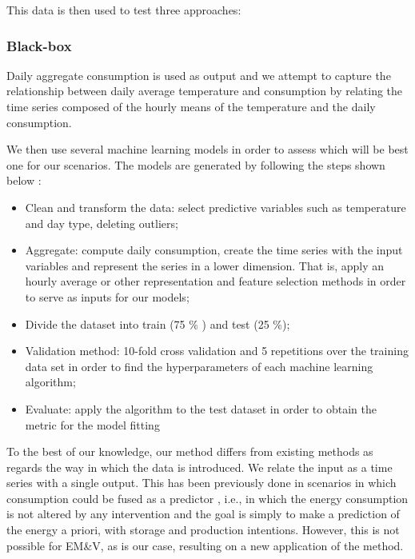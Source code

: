 \documentclass[10pt, conference, compsocconf]{IEEEtran}
\begin{document}
This data is then used to test three approaches:

\subsubsection{Black-box}

Daily aggregate consumption is used as output and we attempt to capture the relationship between daily average temperature and consumption by relating the time series composed of the hourly means of the temperature and the daily consumption.

We then use several machine learning models in order to assess which will be best one for our scenarios. The models are generated by following the steps shown below \cite{gonzalez2016towards}:

\begin{itemize}
\item Clean and transform the data: select predictive variables such as temperature and day type, deleting outliers; 
\item Aggregate: compute daily consumption, create the time series with the input variables and represent the series in a lower dimension. That is, apply an hourly average or other representation and feature selection methods in order to serve as inputs for our models;
\item Divide the dataset into train (75 \% ) and test (25 \%);
\item Validation method: 10-fold cross validation and 5 repetitions over the training data set in order to find the hyperparameters of each machine learning algorithm;
\item Evaluate: apply the algorithm to the test dataset in order to obtain the metric for the model fitting
\end{itemize}


To the best of our knowledge, our method differs from existing methods as regards the way in which the data is introduced. We relate the input as a time series with a single output. This has been previously done in scenarios in which consumption could be fused as a predictor \cite{ruijin2013building}, i.e., in which the energy consumption is not altered by any intervention and the goal is simply to make a prediction of the energy a priori, with storage and production intentions. However, this is not possible for EM\&V, as is our case, resulting on a new application of the method.

\end{document}
